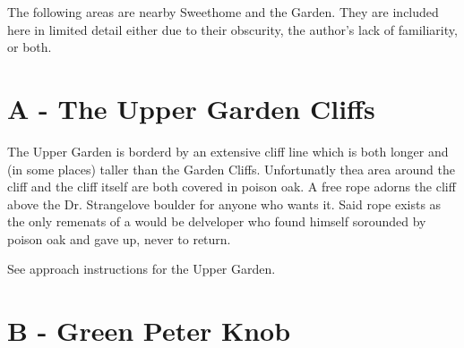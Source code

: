 


































\raggedcolumns
\begin{multicols}{2}


The following areas are nearby Sweethome and the Garden. They are included here in limited detail either due to their obscurity, the author's lack of familiarity, or both.\\



\needspace{6em}

\section{A - The Upper Garden Cliffs}\label{sa:The Upper Garden Cliffs}

The Upper Garden is borderd by an extensive cliff line which is both longer and (in some places) taller than the Garden Cliffs. Unfortunatly thea area around the cliff and the cliff itself are both covered in poison oak. A free rope adorns the cliff above the Dr. Strangelove boulder for anyone who wants it. Said rope exists as the only remenats of a would be delveloper who found himself sorounded by poison oak and gave up, never to return.

See approach instructions for the Upper Garden.\\




\needspace{6em}

\section{B - Green Peter Knob}\label{sa:Green Peter Knob}


\end{multicols}
